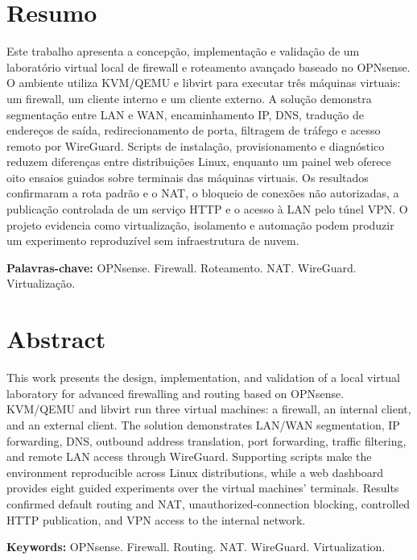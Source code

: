 \documentclass[12pt,a4paper]{article}
\begin{document}
\section*{Resumo}
Este trabalho apresenta a concepção, implementação e validação de um laboratório
virtual local de firewall e roteamento avançado baseado no OPNsense. O ambiente
utiliza KVM/QEMU e libvirt para executar três máquinas virtuais: um firewall,
um cliente interno e um cliente externo. A solução demonstra segmentação entre
LAN e WAN, encaminhamento IP, DNS, tradução de endereços de saída,
redirecionamento de porta, filtragem de tráfego e acesso remoto por WireGuard.
Scripts de instalação, provisionamento e diagnóstico reduzem diferenças entre
distribuições Linux, enquanto um painel web oferece oito ensaios guiados sobre
terminais das máquinas virtuais. Os resultados confirmaram a rota padrão e o NAT, o bloqueio
de conexões não autorizadas, a publicação controlada de um serviço HTTP e o
acesso à LAN pelo túnel VPN. O projeto evidencia como virtualização, isolamento
e automação podem produzir um experimento reproduzível sem infraestrutura de nuvem.

\noindent\textbf{Palavras-chave:} OPNsense. Firewall. Roteamento. NAT. WireGuard. Virtualização.

\newpage
\section*{Abstract}
This work presents the design, implementation, and validation of a local virtual
laboratory for advanced firewalling and routing based on OPNsense. KVM/QEMU and
libvirt run three virtual machines: a firewall, an internal client, and an
external client. The solution demonstrates LAN/WAN segmentation, IP forwarding,
DNS, outbound address translation, port forwarding, traffic filtering, and
remote LAN access through WireGuard. Supporting scripts make the environment
reproducible across Linux distributions, while a web dashboard provides eight
guided experiments over the virtual machines' terminals. Results confirmed default routing
and NAT, unauthorized-connection blocking, controlled HTTP publication, and VPN
access to the internal network.

\noindent\textbf{Keywords:} OPNsense. Firewall. Routing. NAT. WireGuard. Virtualization.

\newpage\tableofcontents
\newpage\listoffigures
\newpage\listoftables
\clearpage{}
\end{document}
